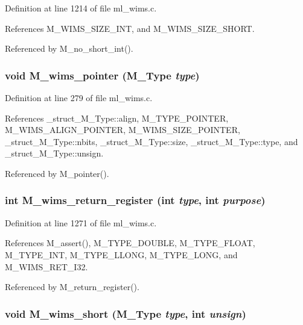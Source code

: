 Definition at line 1214 of file ml\_\-wims.c.

References M\_\-WIMS\_\-SIZE\_\-INT, and M\_\-WIMS\_\-SIZE\_\-SHORT.

Referenced by M\_\-no\_\-short\_\-int().
\subsubsection{\setlength{\rightskip}{0pt plus 5cm}void M\_\-wims\_\-pointer (\bf{M\_\-Type} {\em type})}\label{m__wims_8h_e822751278a8ec6be431bebf9ee6721d}




Definition at line 279 of file ml\_\-wims.c.

References \_\-struct\_\-M\_\-Type::align, M\_\-TYPE\_\-POINTER, M\_\-WIMS\_\-ALIGN\_\-POINTER, M\_\-WIMS\_\-SIZE\_\-POINTER, \_\-struct\_\-M\_\-Type::nbits, \_\-struct\_\-M\_\-Type::size, \_\-struct\_\-M\_\-Type::type, and \_\-struct\_\-M\_\-Type::unsign.

Referenced by M\_\-pointer().
\subsubsection{\setlength{\rightskip}{0pt plus 5cm}int M\_\-wims\_\-return\_\-register (int {\em type}, int {\em purpose})}\label{m__wims_8h_9c2e74ac65301e560a8faf09e05bbcd4}




Definition at line 1271 of file ml\_\-wims.c.

References M\_\-assert(), M\_\-TYPE\_\-DOUBLE, M\_\-TYPE\_\-FLOAT, M\_\-TYPE\_\-INT, M\_\-TYPE\_\-LLONG, M\_\-TYPE\_\-LONG, and M\_\-WIMS\_\-RET\_\-I32.

Referenced by M\_\-return\_\-register().
\subsubsection{\setlength{\rightskip}{0pt plus 5cm}void M\_\-wims\_\-short (\bf{M\_\-Type} {\em type}, int {\em unsign})}\label{m__wims_8h_030412cf6bb0185462a723ec21b989ed}




